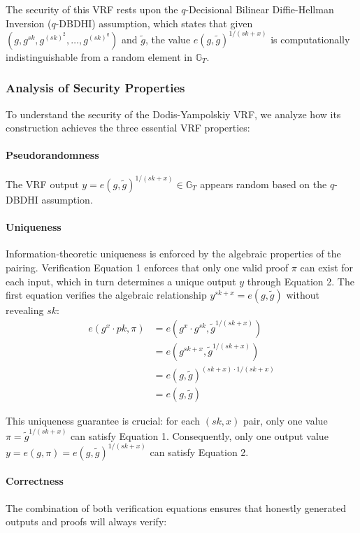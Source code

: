 The security of this VRF rests upon the $q$-Decisional Bilinear Diffie-Hellman Inversion ($q$-DBDHI) assumption, which states that given $(g, g^{sk}, g^{(sk)^2}, \ldots, g^{(sk)^q})$ and $\tilde{g}$, the value $e(g, \tilde{g})^{1/(sk+x)}$ is computationally indistinguishable from a random element in $\mathbb{G}_T$.

\subsubsection{Analysis of Security Properties}

To understand the security of the Dodis-Yampolskiy VRF, we analyze how its construction achieves the three essential VRF properties:

\paragraph{Pseudorandomness}
The VRF output $y = e(g, \tilde{g})^{1/(sk + x)} \in \mathbb{G}_T$ appears random based on the $q$-DBDHI assumption.

\paragraph{Uniqueness}
Information-theoretic uniqueness is enforced by the algebraic properties of the pairing. 
Verification Equation 1 enforces that only one valid proof $\pi$ can exist for each input, which in turn determines a unique output $y$ through Equation 2. The first equation verifies the algebraic relationship $y^{sk+x} = e(g, \tilde{g})$ without revealing $sk$:
\begin{align}
    e(g^{x} \cdot pk, \pi) &= e(g^{x} \cdot g^{sk}, \tilde{g}^{1/(sk + x)}) \\
    &= e(g^{sk + x}, \tilde{g}^{1/(sk + x)}) \\
    &= e(g, \tilde{g})^{(sk + x) \cdot 1/(sk + x)} \\
    &= e(g, \tilde{g})
\end{align}

This uniqueness guarantee is crucial: for each $(sk,x)$ pair, only one value $\pi = \tilde{g}^{1/(sk+x)}$ can satisfy Equation 1. Consequently, only one output value $y = e(g, \pi) = e(g, \tilde{g})^{1/(sk+x)}$ can satisfy Equation 2.

\paragraph{Correctness}
The combination of both verification equations ensures that honestly generated outputs and proofs will always verify:

